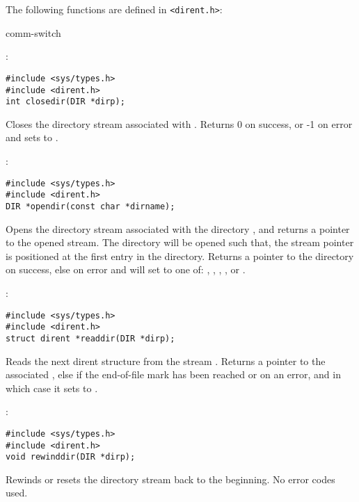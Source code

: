 The following functions are defined in \verb+<dirent.h>+:
\begin{Ventry2}{comm-switch  }

\item[closedir]
\label{item:closedir}
:
\begin{production}
\begin{verbatim}
#include <sys/types.h>
#include <dirent.h>
int closedir(DIR *dirp);
\end{verbatim}
\end{production}

Closes the directory stream associated with .  
Returns  0  on success, or -1 on error and sets  to
. 

\item[opendir]
\label{item:opendir}
:
\begin{production}
\begin{verbatim}
#include <sys/types.h>
#include <dirent.h>
DIR *opendir(const char *dirname);
\end{verbatim}
\end{production}

Opens the directory stream associated with the directory ,
and returns a pointer to the opened stream.  The directory will be opened such
that, the stream pointer is positioned at the first entry in the
directory. Returns a pointer to the directory on success, else
 on error and will set
 to one of: , , , ,
 or . 


\item[readdir]
\label{item:readdir}
:
\begin{production}
\begin{verbatim}
#include <sys/types.h>
#include <dirent.h>
struct dirent *readdir(DIR *dirp);
\end{verbatim}
\end{production}

Reads the next dirent structure from the stream .  Returns a
pointer to the associated , else  if
the end-of-file mark has been reached or on an error,  and  in which case 
it sets  to .


\item[rewinddir]
\label{item:rewinddir}
:
\begin{production}
\begin{verbatim}
#include <sys/types.h>
#include <dirent.h>
void rewinddir(DIR *dirp);
\end{verbatim}
\end{production}

Rewinds or resets the directory stream  back to the
beginning. No error codes used.

\end{Ventry2}



